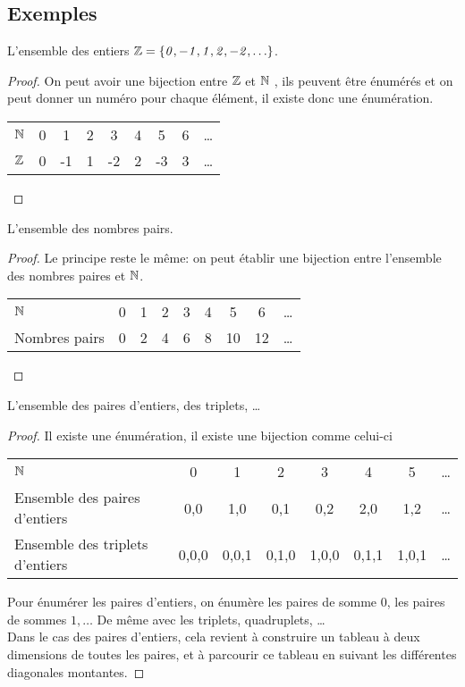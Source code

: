 \subsection{Exemples}
\label{subsec:exemples}

\begin{myexem}
  L'ensemble des entiers $\mathit{\mathbb{Z}=\{0,-1,1,2,-2,\ldots\}}$.
  \begin{proof}
     On peut avoir une bijection entre $\mathbb{Z}$ et $\mathbb{N}$ , ils peuvent être énumérés et on peut donner un numéro pour chaque élément, il existe donc une énumération.

  \begin{tabular}{ l | c c c c c c c r }
     $\mathbb{N}$ & 0 & 1 & 2  & 3 & 4 & 5 & 6 & \ldots \\
     $\mathbb{Z}$ & 0 & -1 & 1 & -2 & 2 & -3 & 3  & \ldots \\

    \end{tabular}
  \end{proof}
\end{myexem}

\begin{myexem}
 L'ensemble des nombres pairs.
  \begin{proof}
  Le principe reste le même: on peut établir une bijection entre l'ensemble des nombres paires et $\mathbb{N}$.

   \begin{tabular}{ l c c c c c c c r }
    $\mathbb{N}$ & 0 & 1 & 2  & 3 & 4 & 5 & 6 & \ldots \\
      Nombres pairs & 0 & 2 & 4 & 6 & 8 & 10 & 12  & \ldots \\
    \end{tabular}
  \end{proof}
\end{myexem}

\begin{myexem}
\label{exem:paire_entiers}
  L'ensemble des paires d'entiers, des triplets, \ldots
    \begin{proof}
        Il existe une énumération, il existe une bijection comme celui-ci

		\begin{tabular}{ l c c  c  c c c  r }
			$\mathbb{N}$  & 0 & 1 & 2  & 3 & 4 & 5 & \ldots  \\
			Ensemble des paires d'entiers & {0,0} & {1,0} & {0,1} & {0,2} & {2,0} & {1,2}  & \ldots \\
			Ensemble des triplets d'entiers & {0,0,0} & {0,0,1} & {0,1,0} & {1,0,0} & {0,1,1} & {1,0,1}  & \ldots \\

		\end{tabular}

	Pour énumérer les paires d'entiers, on énumère les paires de somme 0, les paires de sommes $1, \ldots$ De même avec les triplets, quadruplets, \dots \\
	Dans le cas des paires d'entiers, cela revient à construire un tableau à deux dimensions de toutes les paires, et à parcourir ce tableau en suivant les différentes diagonales montantes.
    \end{proof}
\end{myexem}

